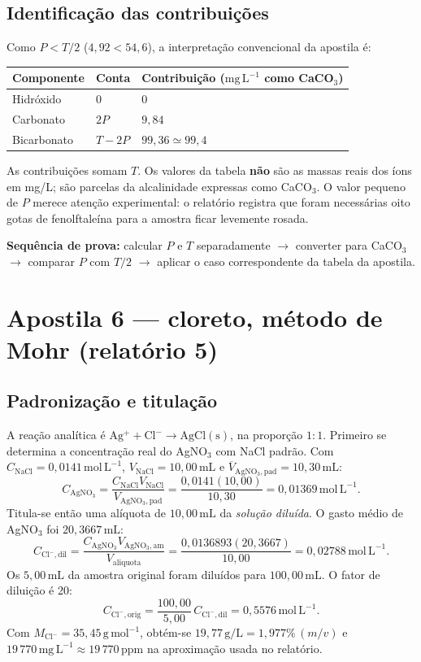 \documentclass[11pt,a4paper]{article}
\newcommand{\molL}{\mathrm{mol\,L^{-1}}}
\newcommand{\mgL}{\mathrm{mg\,L^{-1}}}
\newcommand{\mL}{\mathrm{mL}}
\newcommand{\destaque}[1]{\par\medskip\noindent\colorbox{cinza}{\parbox{\dimexpr\linewidth-2\fboxsep\relax}{\strut #1\strut}}\par\medskip}
\begin{document}
\subsection*{Identificação das contribuições}
Como $P<T/2$ ($4{,}92<54{,}6$), a interpretação convencional da apostila é:
\begin{center}
\begin{tabular}{@{}lll@{}}\toprule
Componente & Conta & Contribuição ($\mgL$ como CaCO$_3$)\\\midrule
Hidróxido & $0$ & $0$\\
Carbonato & $2P$ & $9{,}84$\\
Bicarbonato & $T-2P$ & $99{,}36\simeq99{,}4$\\\bottomrule
\end{tabular}
\end{center}
As contribuições somam $T$. Os valores da tabela \textbf{não} são as massas reais dos íons em mg/L; são parcelas da alcalinidade expressas como CaCO$_3$. O valor pequeno de $P$ merece atenção experimental: o relatório registra que foram necessárias oito gotas de fenolftaleína para a amostra ficar levemente rosada.
\destaque{\textbf{Sequência de prova:} calcular $P$ e $T$ separadamente $\rightarrow$ converter para CaCO$_3$ $\rightarrow$ comparar $P$ com $T/2$ $\rightarrow$ aplicar o caso correspondente da tabela da apostila.}

\section{Apostila 6 --- cloreto, método de Mohr (relatório 5)}
\subsection*{Padronização e titulação}
A reação analítica é $\mathrm{Ag^++Cl^-\rightarrow AgCl(s)}$, na proporção $1{:}1$. Primeiro se determina a concentração real do AgNO$_3$ com NaCl padrão. Com $C_{\mathrm{NaCl}}=0{,}0141\,\molL$, $V_{\mathrm{NaCl}}=10{,}00\,\mL$ e $\overline V_{\mathrm{AgNO_3,pad}}=10{,}30\,\mL$:
\begin{equation}
C_{\mathrm{AgNO_3}}=\frac{C_{\mathrm{NaCl}}V_{\mathrm{NaCl}}}{V_{\mathrm{AgNO_3,pad}}}
=\frac{0{,}0141(10{,}00)}{10{,}30}=0{,}01369\,\molL.
\end{equation}
Titula-se então uma alíquota de $10{,}00\,\mL$ da \emph{solução diluída}. O gasto médio de AgNO$_3$ foi $20{,}3667\,\mL$:
\begin{equation}
C_{\mathrm{Cl^-,dil}}=\frac{C_{\mathrm{AgNO_3}}V_{\mathrm{AgNO_3,am}}}{V_{\mathrm{aliquota}}}
=\frac{0{,}0136893(20{,}3667)}{10{,}00}=0{,}02788\,\molL.
\end{equation}
Os $5{,}00\,\mL$ da amostra original foram diluídos para $100{,}00\,\mL$. O fator de diluição é 20:
\begin{equation}
C_{\mathrm{Cl^-,orig}}=\frac{100{,}00}{5{,}00}\,C_{\mathrm{Cl^-,dil}}
=0{,}5576\,\molL.
\end{equation}
Com $M_{\mathrm{Cl^-}}=35{,}45\,\mathrm{g\,mol^{-1}}$, obtém-se $19{,}77\,\mathrm{g/L}=1{,}977\%\,(m/v)$ e $19\,770\,\mgL\approx19\,770\,\mathrm{ppm}$ na aproximação usada no relatório.
\end{document}
